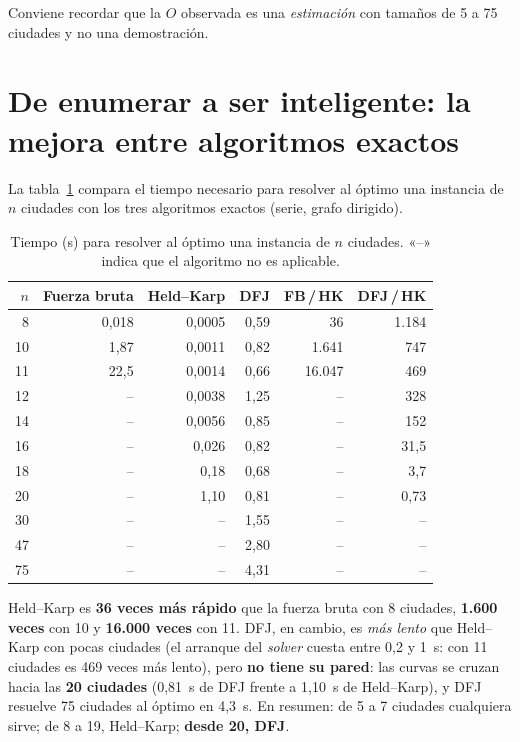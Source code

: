Conviene recordar que la $O$ observada es una \emph{estimación} con tamaños de 5 a 75 ciudades y no una demostración.

\section{De enumerar a ser inteligente: la mejora entre algoritmos exactos}

La tabla~\ref{tab:exactos} compara el tiempo necesario para resolver al óptimo una instancia de $n$ ciudades con los tres algoritmos exactos (serie, grafo dirigido).

\begin{table}[htbp]
  \centering
  \caption{Tiempo (s) para resolver al óptimo una instancia de $n$ ciudades. «--» indica que el algoritmo no es aplicable.}\label{tab:exactos}
  \small
  \begin{tabular}{@{}r r r r@{\qquad}r r@{}}
    \toprule
    $n$ & Fuerza bruta & Held--Karp & DFJ & FB\,/\,HK & DFJ\,/\,HK \\
    \midrule
    8  & 0,018 & 0,0005 & 0,59 & 36 & 1.184 \\
    10 & 1,87 & 0,0011 & 0,82 & 1.641 & 747 \\
    11 & 22,5 & 0,0014 & 0,66 & 16.047 & 469 \\
    12 & -- & 0,0038 & 1,25 & -- & 328 \\
    14 & -- & 0,0056 & 0,85 & -- & 152 \\
    16 & -- & 0,026 & 0,82 & -- & 31,5 \\
    18 & -- & 0,18 & 0,68 & -- & 3,7 \\
    20 & -- & 1,10 & 0,81 & -- & 0,73 \\
    30 & -- & -- & 1,55 & -- & -- \\
    47 & -- & -- & 2,80 & -- & -- \\
    75 & -- & -- & 4,31 & -- & -- \\
    \bottomrule
  \end{tabular}
\end{table}

Held--Karp es \textbf{36 veces más rápido} que la fuerza bruta con 8 ciudades, \textbf{1.600 veces} con 10 y \textbf{16.000 veces} con 11. DFJ, en cambio, es \emph{más lento} que Held--Karp con pocas ciudades (el arranque del \emph{solver} cuesta entre 0,2 y 1~s: con 11 ciudades es 469 veces
más lento), pero \textbf{no tiene su pared}: las curvas se cruzan hacia las \textbf{20 ciudades} (0,81~s de DFJ frente a 1,10~s de Held--Karp), y DFJ resuelve 75 ciudades al óptimo en 4,3~s. En resumen: de 5 a 7 ciudades cualquiera sirve; de 8 a 19, Held--Karp; \textbf{desde 20, DFJ}.

